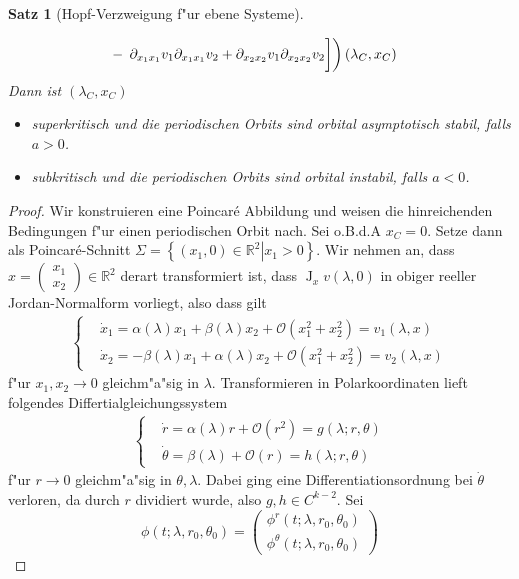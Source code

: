 \documentclass[a4paper, 13pt]{scrreprt}
\newtheorem{satz}{Satz}[section]
\theoremstyle{definition} \newtheorem{definition}{Definition}[section]
\newcommand{\RR}{\mathbb{R}}
\begin{document}
\begin{satz}[Hopf-Verzweigung f"ur ebene Systeme]
\begin{enumerate}
\begin{align*}
\begin{split}
 &- \left . \left . \partial_{x_1x_1}v_1\partial_{x_1x_1}v_2 + \partial_{x_2x_2}v_1\partial_{x_2x_2}v_2 \vphantom{\frac{1}{16}} \right] \right )(\lambda_C, x_C)
\end{split} 
\end{align*}
Dann ist $(\lambda_C, x_C)$ 
\begin{itemize}
\item superkritisch und die periodischen Orbits sind orbital asymptotisch stabil, falls $a>0$.
\item subkritisch und die periodischen Orbits sind orbital instabil, falls $a<0$.
\end{itemize}
\end{enumerate}
\end{satz}
\begin{proof}
Wir konstruieren eine Poincar\'{e} Abbildung und weisen die hinreichenden Bedingungen f"ur einen periodischen Orbit nach. Sei o.B.d.A $x_C = 0$. Setze dann als Poincar\'{e}-Schnitt $\Sigma = \left \{ \left .(x_1, 0) \in \RR^2 \right | x_1 > 0\right \}$. Wir nehmen an, dass $x = \begin{pmatrix}x_1\\x_2\end{pmatrix}\in \RR^2$ derart transformiert ist, dass $\operatorname{J}_xv(\lambda, 0)$ in obiger reeller Jordan-Normalform vorliegt, also dass gilt
\begin{align*}
\begin{cases}
&\dot x_1 = \alpha(\lambda) x_1 + \beta(\lambda) x_2 + \mathcal O(x_1^2+x_2^2) = v_1(\lambda, x)\\
&\dot x_2 = -\beta(\lambda)x_1 + \alpha(\lambda)x_2 + \mathcal O(x_1^2+x_2^2) = v_2(\lambda, x)
\end{cases}
\end{align*}
f"ur $x_1, x_2 \to 0$ gleichm"a"sig in $\lambda$. Transformieren in Polarkoordinaten lieft folgendes Differtialgleichungssystem
\begin{align}\label{beweis_hopf_verz_polarkoordinaten}
\begin{cases}
&\dot r = \alpha(\lambda)r + \mathcal{O}(r^2) = g(\lambda;r,\theta)\\
&\dot \theta = \beta(\lambda) + \mathcal{O}(r) = h(\lambda;r,\theta)
\end{cases}
\end{align}
f"ur $r\to 0$ gleichm"a"sig in $\theta, \lambda$. Dabei ging eine Differentiationsordnung bei $\dot \theta$ verloren, da durch $r$ dividiert wurde, also $g,h \in C^{k-2}$. Sei 
$$\phi(t;\lambda,r_0,\theta_0) = \begin{pmatrix}\phi^r(t;\lambda,r_0,\theta_0)\\ \phi^\theta(t;\lambda,r_0,\theta_0)\end{pmatrix}$$

\end{proof}
\end{document}
